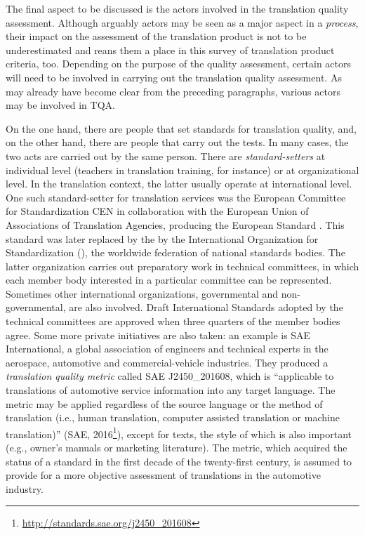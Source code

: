 \documentclass[output=paper]{langsci/langscibook}
\begin{document}
The final aspect to be discussed is the actors involved in the translation quality assessment. Although arguably actors may be seen as a major aspect in a \textit{process}, their impact on the assessment of the translation product is not to be underestimated and reans them a place in this survey of translation product criteria, too. Depending on the purpose of the quality assessment, certain actors will need to be involved in carrying out the translation quality assessment. As may already have become clear from the preceding paragraphs, various actors may be involved in TQA. 

On the one hand, there are people that set standards for translation quality, and, on the other hand, there are people that carry out the tests. In many cases, the two acts are carried out by the same person. There are \textit{standard-setters} at individual level (teachers in translation training, for instance) or at organizational level. In the translation context, the latter usually operate at international level. One such standard-setter for translation services was the European Committee for Standardization CEN in collaboration with the European Union of Associations of Translation Agencies, producing the European Standard \citet{EN2006}. This standard was later replaced by the \citet{ISO2015} by the International Organization for Standardization (\citeauthor{ISO2015}), the worldwide federation of national standards bodies. The latter organization carries out preparatory work in technical committees, in which each member body interested in a particular committee can be represented. Sometimes other international organizations, governmental and non-governmental, are also involved. Draft International Standards adopted by the technical committees are approved when three quarters of the member bodies agree. Some more private initiatives are also taken: an example is SAE International, a global association of engineers and technical experts in the aerospace, automotive and commercial-vehicle industries. They produced a \textit{translation quality metric} called SAE J2450\_201608, which is ``applicable to translations of automotive service information into any target language. The metric may be applied regardless of the source language or the method of translation (i.e., human translation, computer assisted translation or machine translation)'' (SAE, 2016\footnote{\url{http://standards.sae.org/j2450_201608}}), except for texts, the style of which is also important (e.g., owner's manuals or marketing literature). The metric, which acquired the status of a standard in the first decade of the twenty-first century, is assumed to provide for a more objective assessment of translations in the automotive industry. 
\end{document}
